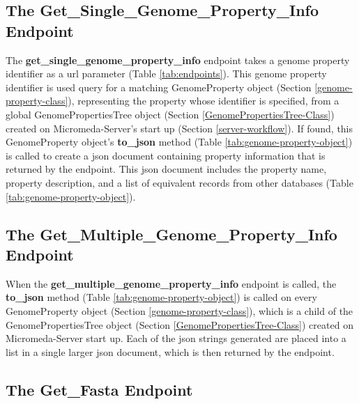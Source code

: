 \subsection{The Get\_Single\_Genome\_Property\_Info Endpoint} \label{get-property-info-endpoint}

The \textbf{get\_single\_genome\_property\_info} endpoint takes a genome property identifier as a \gls{url} parameter (Table \ref{tab:endpoints}). This genome property identifier is used query for a matching GenomeProperty object (Section \ref{genome-property-class}), representing the property whose identifier is specified, from a global GenomePropertiesTree object (Section \ref{GenomePropertiesTree-Class}) created on Micromeda-Server's start up (Section \ref{server-workflow}). If found, this GenomeProperty object's \textbf{to\_json} method (Table \ref{tab:genome-property-object}) is called to create a \gls{json} document containing property information that is returned by the endpoint. This \gls{json} document includes the property name, property description, and a list of equivalent records from other databases (Table \ref{tab:genome-property-object}).

\subsection{The Get\_Multiple\_Genome\_Property\_Info Endpoint}

When the \textbf{get\_multiple\_genome\_property\_info} endpoint is called, the \textbf{to\_json} method (Table \ref{tab:genome-property-object}) is called on every GenomeProperty object (Section \ref{genome-property-class}), which is a child of the GenomePropertiesTree object (Section \ref{GenomePropertiesTree-Class}) created on Micromeda-Server start up. Each of the \gls{json} strings generated are placed into a list in a single larger \gls{json} document, which is then returned by the endpoint. 

\subsection{The Get\_Fasta Endpoint} \label{get-fasta-endpoint}

